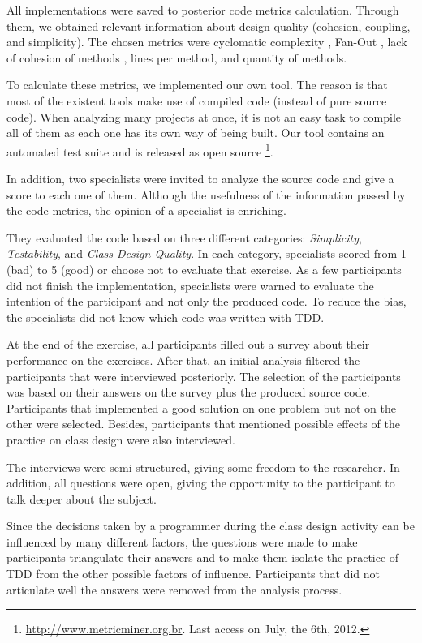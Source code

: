 \documentclass[times]{speauth}
\begin{document}
All implementations were saved to posterior code metrics calculation.
Through them, we obtained relevant information about design quality (cohesion, 
coupling, and simplicity). The chosen metrics were cyclomatic complexity \cite{mccabe},
Fan-Out \cite{lorenz}, lack of cohesion of methods \cite{lcom-hs}, lines per method,
and quantity of methods.

To calculate these metrics, we implemented our own tool. The reason is that
most of the existent tools make use of compiled code (instead of pure source
code). When analyzing many projects at once, it is not an easy task to compile all
of them as each one has its own way of being built.
Our tool contains an automated test suite and is released as open source
\footnote{\url{http://www.metricminer.org.br}. 
Last access on July, the 6th, 2012.}.

In addition, two specialists were invited to analyze the source code and give a score
to each one of them. Although the usefulness of the information passed by the code metrics,
the opinion of a specialist is enriching.

They evaluated the code based on three different categories: \textit{Simplicity}, \textit{Testability},
and \textit{Class Design Quality}. In each category, specialists scored from 1 (bad) to
5 (good) or choose not to evaluate that exercise. As a few participants did not finish the
implementation, specialists were warned to evaluate the intention of the participant and not
only the produced code.
To reduce the bias, the specialists did not know which code was written with TDD.

At the end of the exercise, all participants filled out a survey about their performance
on the exercises. After that, an initial analysis filtered the participants that
were interviewed posteriorly. The selection of the participants was based on
their answers on the survey plus the produced source code. Participants that implemented
a good solution on one problem but not on the other were selected. Besides, participants
that mentioned possible effects of the practice on class design were also interviewed.

The interviews were semi-structured, giving some freedom to the researcher. 
In addition, all questions were open, giving the
opportunity to the participant to talk deeper about the subject.

Since the decisions taken by a programmer during the class design activity can be
influenced by many different factors, the questions were made to make participants
triangulate their answers and to make them isolate the practice of TDD from
the other possible factors of influence. Participants that did not articulate well
the answers were removed from the analysis process.
\end{document}
